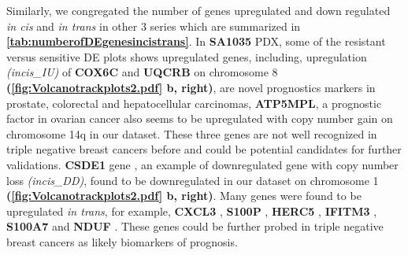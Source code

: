 Similarly, we congregated the number of genes upregulated and down regulated \textit{in cis} and \textit{in trans} in other 3 series which are summarized in \textbf{\autoref{tab:numberofDEgenesincistrans}}.
 In \textbf{SA1035} PDX, some of the resistant versus sensitive DE plots shows upregulated genes, including, upregulation \textit{(incis\_IU)} of  \textbf{COX6C} \cite{yang2018overexpression,chang2017estrogen} and 
 \textbf{UQCRB} \cite{kim2017mitochondrial,park2017mitochondrial} on chromosome 8 \textbf{(\autoref{fig:Volcanotrackplots2.pdf} b, right)}, are novel prognostics markers in prostate, colorectal and hepatocellular carcinomas, \textbf{ATP5MPL}, a prognostic factor in ovarian cancer also seems to be upregulated with copy number gain on chromosome 14q in our dataset. These three genes are not well recognized in triple negative breast cancers before and could be potential candidates for further validations. \textbf{CSDE1} gene \cite{martinez2019unr}, an example of downregulated gene with copy number loss \textit{(incis\_DD)}, found to be downregulated in our dataset on chromosome 1 \textbf{(\autoref{fig:Volcanotrackplots2.pdf} b, right)}. Many genes were found to be upregulated \textit{in trans}, for example,  \textbf{CXCL3} \cite{gui2016overexpression, karin2020cxcr3}, \textbf{S100P} \cite{arumugam2011s100p,cong2020calcium}, 
\textbf{HERC5} \cite{wrage2015identification}, \textbf{IFITM3} \cite{liu2019ifitm3}, \textbf{S100A7} \cite{zhang2019clinical, mayama2018olfm} and \textbf{NDUF} \cite{li2015down}. These genes could be further probed in triple negative breast cancers as likely biomarkers of prognosis.




